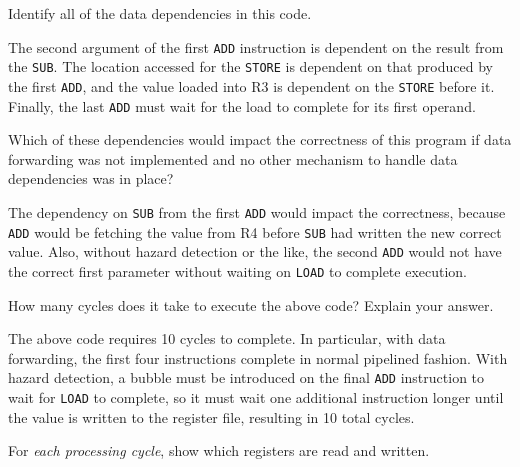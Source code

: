 \documentclass[12pt,letterpaper]{hmcpset}
\begin{document}
\begin{problem}[2a]
Identify all of the data dependencies in this code.
\end{problem}

\begin{solution}
The second argument of the first \texttt{ADD} instruction is dependent on the result from the \texttt{SUB}.
The location accessed for the \texttt{STORE} is dependent on that produced by the first \texttt{ADD}, and the value loaded into R3 is dependent on the \texttt{STORE} before it.
Finally, the last \texttt{ADD} must wait for the load to complete for its first operand.
\end{solution}

\begin{problem}[2b]
Which of these dependencies would impact the correctness of this program if data forwarding was not implemented and no other mechanism to handle data dependencies was in place?
\end{problem}

\begin{solution}
The dependency on \texttt{SUB} from the first \texttt{ADD} would impact the correctness, because \texttt{ADD} would be fetching the value from R4 before \texttt{SUB} had written the new correct value.
Also, without hazard detection or the like, the second \texttt{ADD} would not have the correct first parameter without waiting on \texttt{LOAD} to complete execution.
\end{solution}

\begin{problem}[2c]
How many cycles does it take to execute the above code? Explain your answer.
\end{problem}

\begin{solution}
The above code requires 10 cycles to complete.  In particular, with data forwarding, the first four instructions complete in normal pipelined fashion.  With hazard detection, a bubble must be introduced on the final \texttt{ADD} instruction to wait for \texttt{LOAD} to complete, so it must wait one additional instruction longer until the value is written to the register file, resulting in 10 total cycles.
\end{solution}

\begin{problem}[2d]
For \emph{each processing cycle}, show which registers are read and written.
\end{problem}
\end{document}
